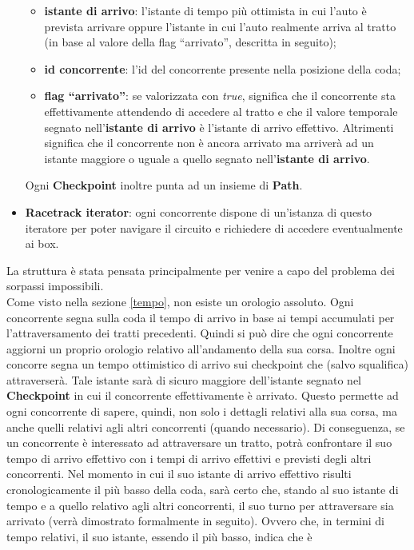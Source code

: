 \begin{itemize}
\begin{itemize}
\item \textbf{istante di arrivo}: l'istante di tempo più ottimista in cui l'auto
è prevista arrivare oppure l'istante in cui l'auto realmente
arriva al tratto (in base al valore della flag ``arrivato'', descritta in
seguito);
\item \textbf{id concorrente}: l'id del concorrente presente nella posizione
della coda;
\item \textbf{flag ``arrivato''}: se valorizzata con \emph{true}, significa che
il concorrente sta effettivamente attendendo di accedere al tratto
e che il valore temporale segnato nell'\textbf{istante di arrivo} è l'istante di
arrivo effettivo. Altrimenti significa che il concorrente non
è ancora arrivato ma arriverà ad un istante maggiore o uguale a quello segnato
nell'\textbf{istante di arrivo}.
\end{itemize}
Ogni \textbf{Checkpoint} inoltre punta ad un insieme di \textbf{Path}.
\item \textbf{Racetrack iterator}: ogni concorrente dispone di un'istanza di
questo iteratore per poter navigare il circuito e richiedere
di accedere eventualmente ai box.
\end{itemize}
La struttura è stata pensata principalmente per venire a capo del problema dei
sorpassi impossibili.\\
Come visto nella sezione \ref{tempo}, non esiste un orologio assoluto. Ogni
concorrente segna sulla
coda il tempo di arrivo in base ai tempi accumulati per l'attraversamento dei
tratti precedenti. Quindi si può dire che ogni
concorrente aggiorni un proprio orologio relativo all'andamento della sua corsa.
Inoltre ogni concorre segna
un tempo ottimistico di arrivo sui checkpoint che (salvo squalifica) attraverserà.
Tale istante sarà di sicuro maggiore dell'istante segnato
nel \textbf{Checkpoint} in cui il concorrente effettivamente è arrivato. Questo
permette ad ogni concorrente di sapere, quindi, non solo
i dettagli relativi alla sua corsa, ma anche quelli relativi agli altri
concorrenti (quando necessario). Di conseguenza, se un concorrente
è interessato ad attraversare un tratto, potrà confrontare il suo tempo di
arrivo effettivo con i tempi di arrivo effettivi e previsti
degli altri concorrenti. Nel momento in cui il suo istante di arrivo effettivo
risulti cronologicamente il più basso della coda, sarà certo
che, stando al suo istante di tempo e a quello relativo agli altri concorrenti,
il suo turno per attraversare sia arrivato (verrà dimostrato formalmente in seguito). Ovvero che, in 
termini di tempo relativi, il suo istante, essendo il più basso, indica che è
